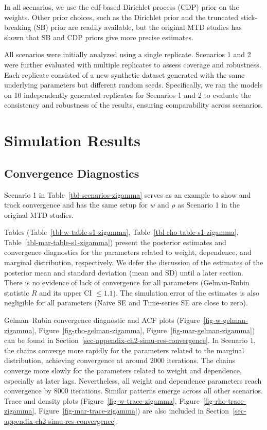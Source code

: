 \documentclass[
  letterpaper,
  double,
  12pt,
  1.0in]{beavtex}
\begin{document}
In all scenarios, we use the cdf-based Dirichlet process (CDP) prior on
the weights. Other prior choices, such as the Dirichlet prior and the
truncated stick-breaking (SB) prior are readily available, but the
original MTD studies has shown that SB and CDP priors give more precise
estimates.

All scenarios were initially analyzed using a single replicate.
Scenarios 1 and 2 were further evaluated with multiple replicates to
assess coverage and robustness. Each replicate consisted of a new
synthetic dataset generated with the same underlying parameters but
different random seeds. Specifically, we ran the models on 10
independently generated replicates for Scenarios 1 and 2 to evaluate the
consistency and robustness of the results, ensuring comparability across
scenarios.

\section{Simulation Results}\label{sec-ch2-simu-res}

\subsection{Convergence Diagnostics}\label{sec-ch2-simu-res-convergence}

Scenario 1 in Table~\ref{tbl-scenarios-zigamma} serves as an example to
show and track convergence and has the same setup for \(w\) and \(\rho\)
as Scenario 1 in the original MTD studies.

Tables (Table~\ref{tbl-w-table-s1-zigamma},
Table~\ref{tbl-rho-table-s1-zigamma},
Table~\ref{tbl-mar-table-s1-zigamma}) present the posterior estimates
and convergence diagnostics for the parameters related to weight,
dependence, and marginal distribution, respectively. We defer the
discussion of the estimates of the posterior mean and standard deviation
(mean and SD) until a later section. There is no evidence of lack of
convergence for all parameters (Gelman-Rubin statistic \(R\) and its
upper CI \(\leq 1.1\)). The simulation error of the estimates is also
negligible for all parameters (Naive SE and Time-series SE are close to
zero).

Gelman--Rubin convergence diagnostic and ACF plots
(Figure~\ref{fig-w-gelman-zigamma}, Figure~\ref{fig-rho-gelman-zigamma},
Figure~\ref{fig-mar-gelman-zigamma}) can be found in
Section~\ref{sec-appendix-ch2-simu-res-convergence}. In Scenario 1, the
chains converge more rapidly for the parameters related to the marginal
distribution, achieving convergence at around \(2000\) iterations. The
chains converge more slowly for the parameters related to weight and
dependence, especially at later lags. Nevertheless, all weight and
dependence parameters reach convergence by \(8000\) iterations. Similar
patterns emerge across all other scenarios. Trace and density plots
(Figure~\ref{fig-w-trace-zigamma}, Figure~\ref{fig-rho-trace-zigamma},
Figure~\ref{fig-mar-trace-zigamma}) are also included in
Section~\ref{sec-appendix-ch2-simu-res-convergence}.
\end{document}
